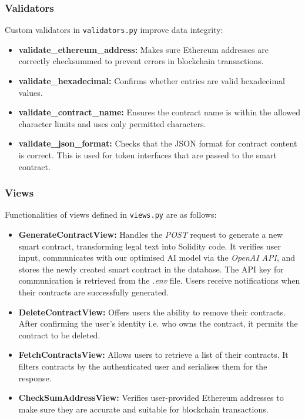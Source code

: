\subsubsection{Validators}

Custom validators in \texttt{validators.py} improve data integrity:
\begin{itemize}
    \item \textbf{validate\_ethereum\_address:} Makes sure Ethereum addresses are correctly checksummed to prevent errors in blockchain transactions.
    \item \textbf{validate\_hexadecimal:} Confirms whether entries are valid hexadecimal values.
    \item \textbf{validate\_contract\_name:} Ensures the contract name is within the allowed character limits and uses only permitted characters.
    \item \textbf{validate\_json\_format:} Checks that the JSON format for contract content is correct. This is used for token interfaces that are passed to the smart contract.
\end{itemize}

\subsubsection{Views}

Functionalities of views defined in \texttt{views.py} are as follows:
\begin{itemize}
    \item \textbf{GenerateContractView:} Handles the \textit{POST} request to generate a new smart contract, transforming legal text into Solidity code. It verifies user input, communicates with our optimised AI model via the \textit{OpenAI API}, and stores the newly created smart contract in the database. The API key for communication is retrieved from the \textit{.env} file. Users receive notifications when their contracts are successfully generated.
    \item \textbf{DeleteContractView:} Offers users the ability to remove their contracts. After confirming the user's identity i.e. who owns the contract, it permits the contract to be deleted.
    \item \textbf{FetchContractsView:}  Allows users to retrieve a list of their contracts. It filters contracts by the authenticated user and serialises them for the response.
    \item \textbf{CheckSumAddressView:} Verifies user-provided Ethereum addresses to make sure they are accurate and suitable for blockchain transactions.
\end{itemize}

